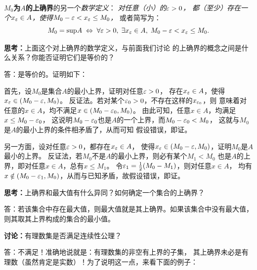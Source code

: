 {\bf $M_0$为$A$的上确界}的另一个{\it 数学定义}：
{\it 对任意（小）的$\varepsilon>0$，
都（至少）存在一个$x_{\varepsilon}\in A$，使得$M_0-\varepsilon<x_{\varepsilon}\leq M_0$，}
或者简写为：
$$M_0=\mathrm{sup}A\;\Leftrightarrow\;
\forall\varepsilon>0,\;\exists x_{\varepsilon}\in A,\;M_0-\varepsilon<x_{\varepsilon}\leq M_0.$$

\bs

{\bf 思考：}上面这个对上确界的数学定义，与前面我们讨论
的上确界的概念之间是什么关系？你能否证明它们是等价的？


\ifhint
答：是等价的。证明如下：

首先，设$M_0$是集合$A$的最小上界，证明对任意$\varepsilon>0$，
存在$x_{\varepsilon}\in A$，使得$x_{\varepsilon}\in(M_0-\varepsilon,M_0)$。
反证法。若对某个$\varepsilon_0>0$，不存在这样的$x_{\varepsilon_0}$，则
意味着对任意的$x\in A$，均不满足$x\in(M_0-\varepsilon_0,M_0)$。
由此可知，任意$x\in A$，均满足$x\leq M_0-\varepsilon_0$，
这说明$M_0-\varepsilon_0$也是$A$的一个上界，而$M_0-\varepsilon_0<M_0$，
这就与$M_0$是$A$的最小上界的条件相矛盾了，从而可知
假设错误，即证。

另一方面，设对任意$\varepsilon>0$，都存在$x_{\varepsilon}\in A$，
使得$x_{\varepsilon}\in(M_0-\varepsilon,M_0)$，证明$M_0$是$A$最小的上界。
反证法，若$M_0$不是$A$的最小上界，则必有某个$M_1<M_0$
也是$A$的上界，即对任意$x\in A$，总有$x\leq M_1$。
令$\varepsilon_1=\frac12(M_0-M_1)$，则对任意$x\in A$，
均有$x\notin(M_0-\varepsilon_1,M_0)$，从而与已知矛盾，故假设错误，即证。
\fin
\fi

\bs

{\bf 思考：}上确界和最大值有什么异同？如何确定一个集合的上确界？

\ifhint
答：若该集合中存在最大值，则最大值就是其上确界。如果该集合中没有最大值，
则其取其上界构成的集合的最小值。
\fi

\bs

{\bf 讨论：}有理数集是否满足连续性公理？

\ifhint
答：不满足！准确地说就是：有理数集的非空有上界的子集，
其上确界未必是有理数（虽然肯定是实数）！为了说明这一点，来看下面的例子：

